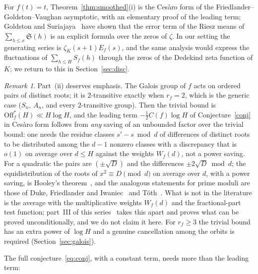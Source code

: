 \documentclass[11pt,a4paper]{article}
\theoremstyle{remark}\newtheorem{remark}[theorem]{Remark}
\newcommand{\Sig}{\mathfrak S}
\begin{document}
For $f(t)=t$, Theorem~\ref{thm:smoothed}(i) is the Ces\`aro form of the Friedlander--Goldston--Vaughan
asymptotic, with an elementary proof of the leading term; Goldston and
Suriajaya~\cite{GoldstonSuriajaya2021,GoldstonSuriajaya2021b} have shown that the error term of the
Riesz means of $\sum_{h\le x}\Sig(h)$ is an explicit formula over the zeros of $\zeta$. In our setting the
generating series is $\zeta_K(s+1)E_f(s)$, and the same analysis would express the fluctuations of
$\sum_{h\le H}S_f(h)$ through the zeros of the Dedekind zeta function of $K$; we return to this in
Section~\ref{sec:disc}.

\begin{remark}\label{rem:two}
Part~(ii) deserves emphasis. The Galois group of $f$ acts on ordered pairs of distinct roots; it is
$2$-transitive exactly when $r_f=2$, which is the generic case ($S_n$, $A_n$, and every $2$-transitive
group). Then the trivial bound is $\mathrm{Off}^\ast_f(H)\ll H\log H$, and the leading term
$-\tfrac12C(f)\log H$ of Conjecture~\ref{conj} in Ces\`aro form follows from \emph{any} saving of an
unbounded factor over the trivial bound: one needs the residue classes $s'-s\bmod d$ of differences of
distinct roots to be distributed among the $d-1$ nonzero classes with a discrepancy that is $o(1)$ on
average over $d\le H$ against the weights $W_f(d)$, not a power saving. For a quadratic the pairs are
$(\pm\sqrt D)$ and the differences $\pm2\sqrt D\bmod d$; the equidistribution of the roots of
$x^2\equiv D\pmod d$ on average over $d$, with a power saving, is Hooley's theorem~\cite{Hooley1963},
and the analogous statements for prime moduli are those of Duke, Friedlander and
Iwaniec~\cite{DFI1995} and T\'oth~\cite{Toth2000}. What is not in the literature is the average with
the multiplicative weights $W_f(d)$ and the fractional-part test function; part~III of this
series~\cite{ReichardtIII} takes this apart and proves what can be proved unconditionally, and we do not claim it here. For $r_f\ge3$ the trivial bound has an extra power of
$\log H$ and a genuine cancellation among the orbits is required (Section~\ref{sec:galois}).
\end{remark}

The full conjecture~\eqref{eq:conj}, with a constant term, needs more than the leading term:
\end{document}
